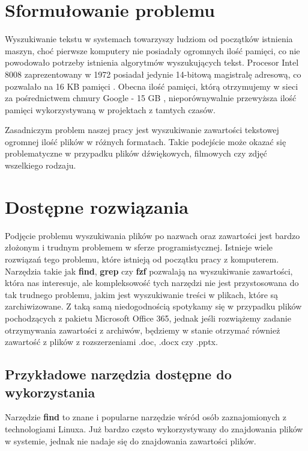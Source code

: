 \section{Sformułowanie problemu}
Wyszukiwanie tekstu w systemach towarzyszy ludziom od początków istnienia maszyn,
choć pierwsze komputery nie posiadały ogromnych ilość pamięci, co nie powodowało
potrzeby istnienia algorytmów wyszukujących tekst. Procesor Intel 8008 
zaprezentowany w 1972 posiadał jedynie 14-bitową magistralę adresową, co 
pozwalało na 16 KB pamięci \cite{bib:internet:Intel8008}. Obecna ilość pamięci,
którą otrzymujemy w sieci za pośrednictwem chmury Google - 15 GB \cite{bib:internet:GoogleCloud},
nieporównywalnie przewyższa ilość pamięci wykorzystywaną w projektach z tamtych
czasów.

Zasadniczym problem naszej pracy jest wyszukiwanie zawartości tekstowej
ogromnej ilość plików w różnych formatach. Takie podejście może okazać się 
problematyczne \newline w przypadku plików dźwiękowych, filmowych czy zdjęć
wszelkiego rodzaju.

\section{Dostępne rozwiązania} %

Podjęcie problemu wyszukiwania plików po nazwach oraz zawartości jest bardzo
złożonym i trudnym problemem w sferze programistycznej. Istnieje wiele rozwiązań
tego problemu, które istnieją od początku pracy z komputerem. Narzędzia takie
jak \textbf{find}, \textbf{grep} czy \textbf{fzf} \cite{bib:internet:Fzf} pozwalają na wyszukiwanie
zawartości, która nas interesuje, ale kompleksowość tych narzędzi nie jest 
przystosowana do tak trudnego problemu, jakim jest wyszukiwanie treści w plikach,
które są zarchiwizowane. Z taką samą niedogodnością spotykamy się w przypadku
plików pochodzących z pakietu Microsoft Office 365, jednak jeśli rozwiążemy 
zadanie otrzymywania zawartości z archiwów, będziemy w stanie otrzymać również 
zawartość z plików z rozszerzeniami .doc, .docx czy .pptx.

\subsection{Przykładowe narzędzia dostępne do wykorzystania}

Narzędzie \textbf{find} to znane i popularne narzędzie wśród osób zaznajomionych z
technologiami Linuxa. Już bardzo często wykorzystywany do znajdowania plików
w systemie, jednak nie nadaje się do znajdowania zawartości plików.

